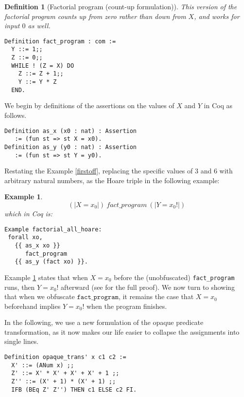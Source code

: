 \documentclass[compsoc,conference,a4paper,10pt,times]{IEEEtran}
\newtheorem{defin}[theorem]{Definition}
\newtheorem{example}[theorem]{Example}
\begin{document}
\begin{defin}[Factorial program (count-up formulation)]
This version of the factorial program counts up from zero rather than down from $X$, and works for input $0$ as well.
\begin{verbatim}
Definition fact_program : com :=
  Y ::= 1;;
  Z ::= 0;;
  WHILE ! (Z = X) DO
    Z ::= Z + 1;;
    Y ::= Y * Z
  END.
\end{verbatim}
\end{defin}

We begin by definitions of the assertions on the values of $X$ and $Y$ in Coq as follows.

\begin{verbatim}
Definition as_x (x0 : nat) : Assertion 
   := (fun st => st X = x0).
Definition as_y (y0 : nat) : Assertion 
   := (fun st => st Y = y0).
\end{verbatim}

Restating the Example \ref{firstoff}, replacing the specific values of $3$ and $6$ with arbitrary natural numbers, as the Hoare triple in the following example:


\begin{example}\label{hoareexample1}
    \[
     (|X=x_0|)\ fact\_program\ (|Y=x_0!|)
    \]
which in Coq is:
    \begin{verbatim}
Example factorial_all_hoare: 
 forall xo,
   {{ as_x xo }} 
      fact_program 
   {{ as_y (fact xo) }}.
  \end{verbatim}
\end{example}
 
Example \ref{hoareexample1} states that when $X = x_0$ before the (unobfuscated) \texttt{fact\_program} runs, then $Y = x_0!$ afterward (see \cite{Weyun} for the full proof). We now turn to showing that when we obfuscate $\texttt{fact\_program}$, it remains the case that $X = x_0$ beforehand implies $Y = x_0!$ when the program finishes.

\par

In the following, we use a new formulation of the opaque predicate transformation, as it now makes our life easier to collapse the assignments into single lines.

\begin{verbatim}
Definition opaque_trans' x c1 c2 :=
  X' ::= (ANum x) ;;
  Z' ::= X' * X' + X' + X' + 1 ;;
  Z'' ::= (X' + 1) * (X' + 1) ;;
  IFB (BEq Z' Z'') THEN c1 ELSE c2 FI.
\end{verbatim}
\end{document}
